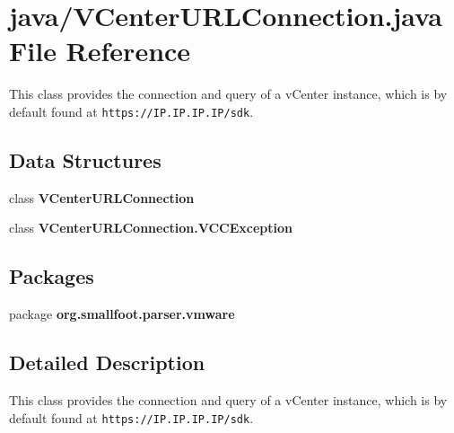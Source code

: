 \section{java/\+V\+Center\+U\+R\+L\+Connection.java File Reference}
\label{VCenterURLConnection_8java}


This class provides the connection and query of a v\+Center instance, which is by default found at {\tt https\+://\+I\+P.\+I\+P.\+I\+P.\+I\+P/sdk}.  


\subsection*{Data Structures}
\begin{DoxyCompactItemize}
\item 
class {\bf V\+Center\+U\+R\+L\+Connection}
\item 
class {\bf V\+Center\+U\+R\+L\+Connection.\+V\+C\+C\+Exception}
\end{DoxyCompactItemize}
\subsection*{Packages}
\begin{DoxyCompactItemize}
\item 
package {\bf org.\+smallfoot.\+parser.\+vmware}
\end{DoxyCompactItemize}


\subsection{Detailed Description}
This class provides the connection and query of a v\+Center instance, which is by default found at {\tt https\+://\+I\+P.\+I\+P.\+I\+P.\+I\+P/sdk}. 

